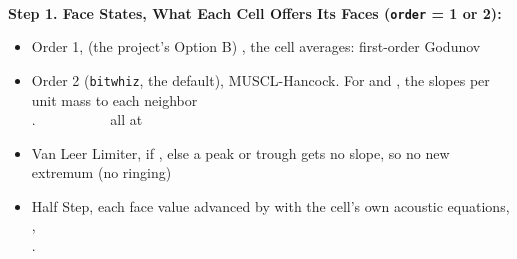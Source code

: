 \documentclass[11pt,addpoints]{exam}
\begin{document}
\;\\

\begin{tcolorbox}[breakable]
\textbf{Step 1. Face States, What Each Cell Offers Its Faces (\texttt{order} = 1 or 2):}\vspace{.5em}
\begin{itemize}
\item Order 1, \hspace{3mm} (the project's Option B) \hspace{3mm} , \hspace{3mm}  \hspace{7mm} the cell averages: first-order Godunov\vspace{.5em}
\item Order 2 (\texttt{bitwhiz}, the default), \hspace{3mm} MUSCL-Hancock. For  and , the slopes per unit mass to each neighbor\vspace{.5em}\\
.~~~~~~~~~~ \hspace{9mm}  \hspace{7mm} all at \vspace{1em}
\item Van Leer Limiter, \hspace{3mm}  \hspace{2mm} if , \hspace{2mm} else  \hspace{7mm} a peak or trough gets no slope, so no new extremum (no ringing)\vspace{.5em}
\item Half Step, \hspace{3mm} each face value advanced by  with the cell's own acoustic equations, \hspace{2mm} , \hspace{2mm} \vspace{.5em}\\
.~~~~~~~~~~\vspace{1em}\\

\end{itemize}
\end{tcolorbox}
\end{document}
